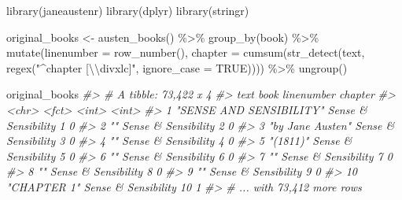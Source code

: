 \documentclass[
]{book}
\newenvironment{Shaded}{\begin{snugshade}}{\end{snugshade}}
\newcommand{\AttributeTok}[1]{\textcolor[rgb]{0.77,0.63,0.00}{#1}}
\newcommand{\CommentTok}[1]{\textcolor[rgb]{0.56,0.35,0.01}{\textit{#1}}}
\newcommand{\ConstantTok}[1]{\textcolor[rgb]{0.00,0.00,0.00}{#1}}
\newcommand{\FunctionTok}[1]{\textcolor[rgb]{0.00,0.00,0.00}{#1}}
\newcommand{\NormalTok}[1]{#1}
\newcommand{\OtherTok}[1]{\textcolor[rgb]{0.56,0.35,0.01}{#1}}
\newcommand{\SpecialCharTok}[1]{\textcolor[rgb]{0.00,0.00,0.00}{#1}}
\newcommand{\StringTok}[1]{\textcolor[rgb]{0.31,0.60,0.02}{#1}}
\begin{document}
\begin{Shaded}
\begin{Highlighting}[]
\FunctionTok{library}\NormalTok{(janeaustenr)}
\FunctionTok{library}\NormalTok{(dplyr)}
\FunctionTok{library}\NormalTok{(stringr)}

\NormalTok{original\_books }\OtherTok{\textless{}{-}} \FunctionTok{austen\_books}\NormalTok{() }\SpecialCharTok{\%\textgreater{}\%}
  \FunctionTok{group\_by}\NormalTok{(book) }\SpecialCharTok{\%\textgreater{}\%}
  \FunctionTok{mutate}\NormalTok{(}\AttributeTok{linenumber =} \FunctionTok{row\_number}\NormalTok{(),}
         \AttributeTok{chapter =} \FunctionTok{cumsum}\NormalTok{(}\FunctionTok{str\_detect}\NormalTok{(text, }
                                     \FunctionTok{regex}\NormalTok{(}\StringTok{"\^{}chapter [}\SpecialCharTok{\textbackslash{}\textbackslash{}}\StringTok{divxlc]"}\NormalTok{,}
                                           \AttributeTok{ignore\_case =} \ConstantTok{TRUE}\NormalTok{)))) }\SpecialCharTok{\%\textgreater{}\%}
  \FunctionTok{ungroup}\NormalTok{()}

\NormalTok{original\_books}
\CommentTok{\#\textgreater{} \# A tibble: 73,422 x 4}
\CommentTok{\#\textgreater{}    text                    book                linenumber chapter}
\CommentTok{\#\textgreater{}    \textless{}chr\textgreater{}                   \textless{}fct\textgreater{}                    \textless{}int\textgreater{}   \textless{}int\textgreater{}}
\CommentTok{\#\textgreater{}  1 "SENSE AND SENSIBILITY" Sense \& Sensibility          1       0}
\CommentTok{\#\textgreater{}  2 ""                      Sense \& Sensibility          2       0}
\CommentTok{\#\textgreater{}  3 "by Jane Austen"        Sense \& Sensibility          3       0}
\CommentTok{\#\textgreater{}  4 ""                      Sense \& Sensibility          4       0}
\CommentTok{\#\textgreater{}  5 "(1811)"                Sense \& Sensibility          5       0}
\CommentTok{\#\textgreater{}  6 ""                      Sense \& Sensibility          6       0}
\CommentTok{\#\textgreater{}  7 ""                      Sense \& Sensibility          7       0}
\CommentTok{\#\textgreater{}  8 ""                      Sense \& Sensibility          8       0}
\CommentTok{\#\textgreater{}  9 ""                      Sense \& Sensibility          9       0}
\CommentTok{\#\textgreater{} 10 "CHAPTER 1"             Sense \& Sensibility         10       1}
\CommentTok{\#\textgreater{} \# ... with 73,412 more rows}
\end{Highlighting}
\end{Shaded}
\end{document}
